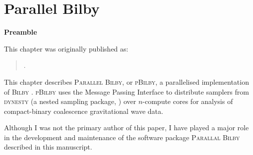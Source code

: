 \chapter[Parallel Bilby]{Parallel Bilby}
\label{ch.pbilby}

\textbf{Preamble}

This chapter was originally published as:

\begin{quote}
.
\end{quote}

This chapter describes \textsc{Parallel Bilby}, or \textsc{pBilby}, a parallelised implementation of \textsc{Bilby} \cite{bilby_paper, pbilby}. 
\textsc{pBilby} uses the Message Passing Interface \cite{mpi} to distribute samplers from \textsc{dynesty} (a nested sampling package, \cite{dynesty_paper}) over $n$-compute cores for analysis of compact-binary coalescence gravitational wave data.

Although I was not the primary author of this paper, I have played a major role in the development and maintenance of the software package \textsc{Parallal Bilby} described in this manuscript. 




